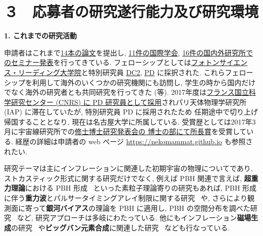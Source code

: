 \documentclass[11pt,a4j,dvipdfmx]{jarticle} 					%
\newcommand{\研究課題名}{\mgfamily\sffamily ストカスティック形式で迫る重力と量子論}
\newcommand{\研究機関名}{\mgfamily\sffamily 名古屋大学}
\newcommand{\研究代表者氏名}{\mgfamily\sffamily 多田祐一郎}
\newcommand{\研究期間の最終元号年度}{34}  %
\renewcommand{\emph}[1]{{\sffamily\gtfamily\bfseries #1}}
\begin{document}

\section{３　応募者の研究遂行能力及び研究環境}


\begin{mdframed}[roundcorner=0.5zw,
	innertopmargin=0.8zw,innerbottommargin=0.8zw,
	linecolor=black!50,linewidth=0.2zw,
	backgroundcolor=black!10]
	{\bfseries\gtfamily\sffamily\large 1. これまでの研究活動}
\end{mdframed}

申請者はこれまで\ul{14本の論文}を提出し, \ul{11件の国際学会}, \ul{16件の国内外研究所でのセミナー発表}を行ってきている.
フェローシップとしては\ul{フォトンサイエンス・リーディング大学院}と特別研究員 \ul{DC2}, \ul{PD} に採択された.
これらフェローシップを利用して海外のいくつかの研究機関にも訪問し, 学生の時から国内だけでなく海外の研究者とも共同研究を行ってきた 
(\cite{Tada:2016pmk}等). 2017年度は\ul{フランス国立科学研究センター (CNRS) に PD 研究員として採用}されパリ天体物理学研究所 (IAP) に滞在していたが, 特別研究員 PD に採用されたため
任期途中で切り上げ帰国することとなり, 現在は名古屋大学に所属している. 受賞歴としては2017年3月に宇宙線研究所での\ul{修士博士研究発表会の
博士の部にて所長賞}を受賞している.
経歴の詳細は申請者の web ページ \url{https://nekomammat.github.io} も参照されたい.

研究テーマは主にインフレーションに関連した初期宇宙の物理についてであり, ストカスティック形式に関する研究だけでなく, 
例えば PBH 関連で言えば, \emph{超重力理論}における PBH 形成~\cite{Kawasaki:2016pql} といった素粒子理論寄りの研究もあれば,
PBH 形成に伴う\emph{重力波}とパルサータイミングアレイ制限に関する研究~\cite{Inomata:2016rbd} や, さらにより観測面に寄って\emph{銀河バイアス}の理論を PBH に適用し, 
PBH の空間分布を調べた研究~\cite{Tada:2015noa} など, 研究アプローチは多岐にわたっている.
他にもインフレーション\emph{磁場生成}の研究~\cite{Fujita:2015iga} や\emph{ビッグバン元素合成}に関連した研究~\cite{Inomata:2016uip} なども行なっている.
\end{document}
